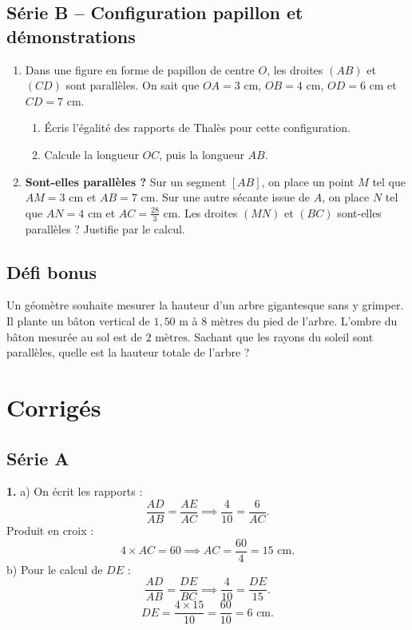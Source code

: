 \documentclass[../main.tex]{subfiles}
\begin{document}
\subsection{Série B -- Configuration papillon et démonstrations}

\begin{enumerate}[label=\textbf{\arabic*.},start=3]
\item Dans une figure en forme de papillon de centre $O$, les droites $(AB)$ et $(CD)$ sont parallèles.
On sait que $OA = 3\text{ cm}$, $OB = 4\text{ cm}$, $OD = 6\text{ cm}$ et $CD = 7\text{ cm}$.
\begin{enumerate}[label=\alph*)]
  \item Écris l'égalité des rapports de Thalès pour cette configuration.
  \item Calcule la longueur $OC$, puis la longueur $AB$.
\end{enumerate}

\item \textbf{Sont-elles parallèles ?} Sur un segment $[AB]$, on place un point $M$ tel que $AM = 3\text{ cm}$ et $AB = 7\text{ cm}$. Sur une autre sécante issue de $A$, on place $N$ tel que $AN = 4\text{ cm}$ et $AC = \frac{28}{3}\text{ cm}$. Les droites $(MN)$ et $(BC)$ sont-elles parallèles ? Justifie par le calcul.
\end{enumerate}

\subsection{Défi bonus}

Un géomètre souhaite mesurer la hauteur d'un arbre gigantesque sans y grimper. Il plante un bâton vertical de $1{,}50\text{ m}$ à $8\text{ mètres}$ du pied de l'arbre. L'ombre du bâton mesurée au sol est de $2\text{ mètres}$.
Sachant que les rayons du soleil sont parallèles, quelle est la hauteur totale de l'arbre ?

\newpage
\section{Corrigés}

\subsection*{Série A}

\textbf{1.} a) On écrit les rapports :
\[
\frac{AD}{AB} = \frac{AE}{AC}
\implies \frac{4}{10} = \frac{6}{AC}.
\]
Produit en croix :
\[
4 \times AC = 60 \implies AC = \frac{60}{4} = 15\text{ cm}.
\]
b) Pour le calcul de $DE$ :
\[
\frac{AD}{AB} = \frac{DE}{BC}
\implies \frac{4}{10} = \frac{DE}{15}.
\]
\[
DE = \frac{4 \times 15}{10} = \frac{60}{10} = 6\text{ cm}.
\]
\end{document}

